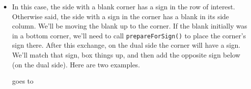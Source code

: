 \documentclass[12pt]{article}
\numberwithin{equation}{section}
\newcommand{\horizontalDominoRSShift}[4]{\filldraw [dominoRSStyle] (#2 - 1 + #4 + \eps, #1 - 1 + \eps) rectangle + (2 - \teps, 1 -\teps) node [dominoText] {$#3$};}
\begin{document}
\begin{itemize}
\begin{itemize}
      \item In this case, the side with a blank corner has a sign in the row of interest.
      Otherwise said, the side with a sign in the corner has a blank in its side column.
      We'll be moving the blank up to the corner.
      If the blank initially was in a bottom corner, we'll need to call \texttt{prepareForSign()} to place the corner's sign there.
      After this exchange, on the dual side the corner will have a sign.
      We'll match that sign, box things up, and then add the opposite sign below (on the dual side).
      Here are two examples.
      \begin{figure}[H]
        \centering
      \end{figure}
      goes to
      \begin{figure}[H]
        \centering
\end{figure}
\end{itemize}
\end{itemize}
\end{document}
